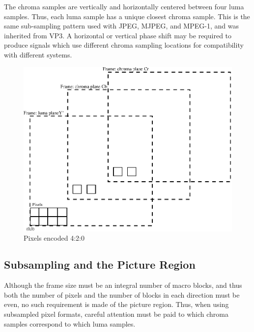 \documentclass[9pt,letterpaper]{book}
\numberwithin{equation}{chapter}
\numberwithin{figure}{chapter}
\numberwithin{table}{chapter}
\begin{document}
The chroma samples are vertically and horizontally centered between four luma
 samples.
Thus, each luma sample has a unique closest chroma sample.
This is the same sub-sampling pattern used with JPEG, MJPEG, and MPEG-1, and
 was inherited from VP3.
A horizontal or vertical phase shift may be required to produce signals which
 use different chroma sampling locations for compatibility with different
 systems.

\begin{figure}[htbp]
\begin{center}
\includegraphics{pixel420}
\end{center}
\caption{Pixels encoded 4:2:0}
\label{fig:pixel420}
\end{figure}

%
%
%
%
%
%
%
%
%
%

\subsection{Subsampling and the Picture Region}

Although the frame size must be an integral number of macro blocks, and thus
 both the number of pixels and the number of blocks in each direction must be
 even, no such requirement is made of the picture region.
Thus, when using subsampled pixel formats, careful attention must be paid to
 which chroma samples correspond to which luma samples.
\end{document}
